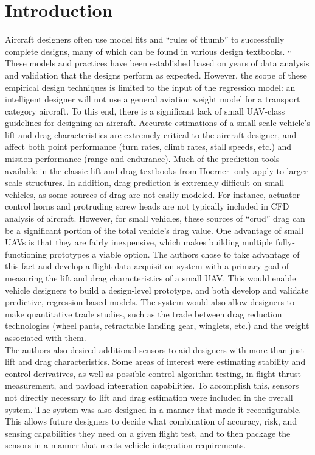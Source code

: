 \section{Introduction}
\label{intro}
Aircraft designers often use model fits and ``rules of thumb'' to successfully complete designs, many of which can be found in various design textbooks. \cite{raymer}$^,$\cite{nicolai2010fundamentals}$^,$\cite{roskam1985airplane} These models and practices have been established based on years of data analysis and validation that the designs perform as expected. However, the scope of these empirical design techniques is limited to the input of the regression model: an intelligent designer will not use a general aviation weight model for a transport category aircraft. To this end, there is a significant lack of small UAV-class guidelines for designing an aircraft. Accurate estimations of a small-scale vehicle's lift and drag characteristics are extremely critical to the aircraft designer, and affect both point performance (turn rates, climb rates, stall speeds, etc.) and mission performance (range and endurance). Much of the prediction tools available in the classic lift and drag textbooks from Hoerner\cite{hoernerDrag}$^,$\cite{hoernerLift} only apply to larger scale structures. In addition, drag prediction is extremely difficult on small vehicles, as some sources of drag are not easily modeled. For instance, actuator control horns and protruding screw heads are not typically included in CFD  analysis of aircraft. However, for small vehicles, these sources of ``crud'' drag can be a significant portion of the total vehicle's drag value. One advantage of small UAVs is that they are fairly inexpensive, which makes building multiple fully-functioning prototypes a viable option. The authors chose to take advantage of this fact and develop a flight data acquisition system with a primary goal of measuring the lift and drag characteristics of a small UAV. This would enable vehicle designers to build a design-level prototype, and both develop and validate predictive, regression-based models. The system would also allow designers to make quantitative trade studies, such as the trade between drag reduction technologies (wheel pants, retractable landing gear, winglets, etc.) and the weight associated with them.\\

The authors also desired additional sensors to aid designers with more than just lift and drag characteristics. Some areas of interest were estimating stability and control derivatives, as well as possible control algorithm testing, in-flight thrust measurement, and payload integration capabilities. To accomplish this, sensors not directly necessary to lift and drag estimation were included in the overall system. The system was also designed in a manner that made it reconfigurable. This allows future designers to decide what combination of accuracy, risk, and sensing capabilities they need on a given flight test, and to then package the sensors in a manner that meets vehicle integration requirements.\\

